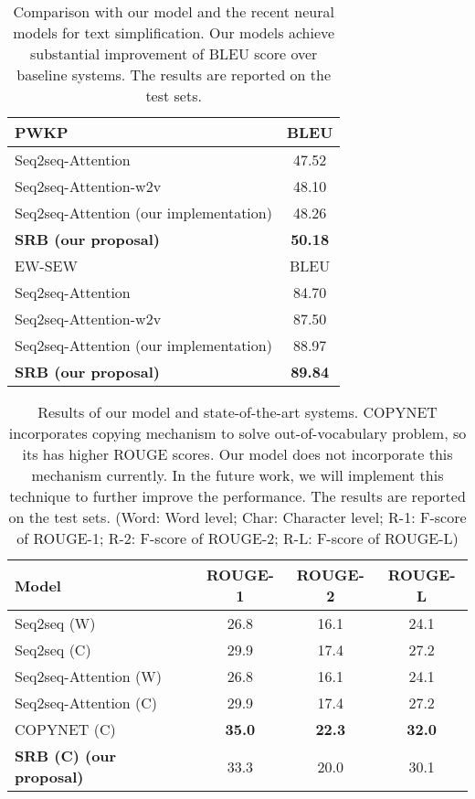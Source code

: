 \documentclass{clv3}
\begin{document}
\begin{CJK*}{UTF8}{gbsn}
\begin{table}[tb]
	\centering
	\caption{Comparison with our model and the recent neural models for text simplification. Our models achieve substantial improvement of BLEU score over baseline systems. The results are reported on the test sets.}\label{tab3}
	\begin{tabular}{|@{~} l@{~}|c|}
		\hline
		PWKP & BLEU \\ 
		\hline
		Seq2seq-Attention~\cite{NisioiEA2017} & 47.52\\
		Seq2seq-Attention-w2v~\cite{NisioiEA2017} &  48.10 \\ 
		\hline
		Seq2seq-Attention (our implementation) & 48.26 \\ 
		\textbf{SRB (our proposal)}  & \textbf{50.18}  \\ 
		\hline
		\hline
		EW-SEW & BLEU  \\ 
		\hline
		Seq2seq-Attention~\cite{NisioiEA2017} &  84.70  \\
		Seq2seq-Attention-w2v~\cite{NisioiEA2017}  & 87.50  \\ 
		\hline
		Seq2seq-Attention (our implementation)  & 88.97  \\ 
		\textbf{SRB (our proposal)} &  \textbf{89.84}  \\ 
		\hline
	\end{tabular}
\end{table}


\begin{table}[tb]
	\centering
	\caption{Results of our model and state-of-the-art systems. COPYNET incorporates copying mechanism to solve out-of-vocabulary problem, so its has higher ROUGE scores. Our model does not incorporate this mechanism
		currently. In the future work, we will implement this technique to further improve the performance. The results are reported on the test sets. (Word: Word level; Char: Character level; R-1: F-score of ROUGE-1; R-2: F-score of ROUGE-2; R-L: F-score of ROUGE-L)} \label{tab4}
	\newcommand{\tabincell}[2]{\begin{tabular}{@{}#1@{}}#2\end{tabular}}
	\begin{tabular}{|l|c|c|c|}
		\hline
		Model & ROUGE-1 & ROUGE-2 & ROUGE-L \\
		\hline
		Seq2seq (W)~\cite{lcsts} & 26.8 & 16.1 &  24.1 \\
		Seq2seq (C)~\cite{lcsts} & 29.9 & 17.4  &  27.2 \\
		Seq2seq-Attention (W)~\cite{lcsts} & 26.8 & 16.1 &  24.1 \\
		Seq2seq-Attention (C)~\cite{lcsts} & 29.9 & 17.4  &  27.2 \\
		COPYNET (C)~\cite{copynet} & \textbf{35.0} & \textbf{22.3} & \textbf{32.0} \\
		\hline
		\textbf{SRB (C) (our proposal)} & 33.3 & 20.0 & 30.1 \\
		\hline
	\end{tabular}
\end{table}


\end{CJK*}
\end{document}
